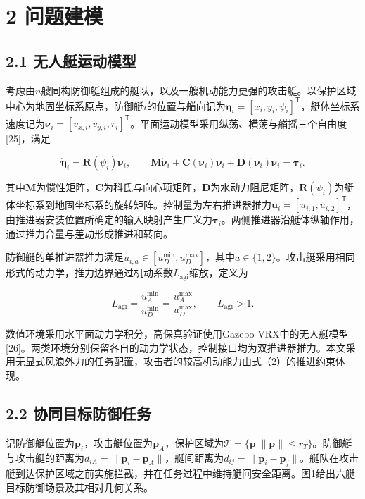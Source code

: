 \documentclass[
  11pt,
  fontset=none]{ctexart}
\begin{document}
\section{2 问题建模}\label{ux95eeux9898ux5efaux6a21}

\subsection{2.1
无人艇运动模型}\label{ux65e0ux4ebaux8247ux8fd0ux52a8ux6a21ux578b}

考虑由\(n\)艘同构防御艇组成的艇队，以及一艘机动能力更强的攻击艇。以保护区域中心为地固坐标系原点，防御艇\(i\)的位置与艏向记为\(\boldsymbol\eta_i=[x_i,y_i,\psi_i]^\mathsf T\)，艇体坐标系速度记为\(\boldsymbol\nu_i=[v_{x,i},v_{y,i},r_i]^\mathsf T\)。平面运动模型采用纵荡、横荡与艏摇三个自由度{[}25{]}，满足

\[
\dot{\boldsymbol\eta}_i=\boldsymbol R(\psi_i)\boldsymbol\nu_i,
\qquad
\boldsymbol M\dot{\boldsymbol\nu}_i+
\boldsymbol C(\boldsymbol\nu_i)\boldsymbol\nu_i+
\boldsymbol D(\boldsymbol\nu_i)\boldsymbol\nu_i
=\boldsymbol\tau_i .
\tag{1}
\]

其中\(\boldsymbol M\)为惯性矩阵，\(\boldsymbol C\)为科氏与向心项矩阵，\(\boldsymbol D\)为水动力阻尼矩阵，\(\boldsymbol R(\psi_i)\)为艇体坐标系到地固坐标系的旋转矩阵。控制量为左右推进器推力\(\boldsymbol u_i=[u_{i,1},u_{i,2}]^\mathsf T\)，由推进器安装位置所确定的输入映射产生广义力\(\boldsymbol\tau_i\)。两侧推进器沿艇体纵轴作用，通过推力合量与差动形成推进和转向。

防御艇的单推进器推力满足\(u_{i,a}\in[u_D^{\min},u_D^{\max}]\)，其中\(a\in\{1,2\}\)。攻击艇采用相同形式的动力学，推力边界通过机动系数\(L_{\mathrm{agi}}\)缩放，定义为

\[
L_{\mathrm{agi}}=
\frac{u_A^{\min}}{u_D^{\min}}
=
\frac{u_A^{\max}}{u_D^{\max}},
\qquad L_{\mathrm{agi}}>1 .
\tag{2}
\]

数值环境采用水平面动力学积分，高保真验证使用Gazebo
VRX中的无人艇模型{[}26{]}。两类环境分别保留各自的动力学状态，控制接口均为双推进器推力。本文采用无显式风浪外力的任务配置，攻击者的较高机动能力由式（2）的推进约束体现。

\subsection{2.2
协同目标防御任务}\label{ux534fux540cux76eeux6807ux9632ux5fa1ux4efbux52a1}

记防御艇位置为\(\boldsymbol p_i\)，攻击艇位置为\(\boldsymbol p_A\)，保护区域为\(\mathcal T=\{\boldsymbol p\mid\|\boldsymbol p\|\leq r_T\}\)。防御艇与攻击艇的距离为\(d_{iA}=\|\boldsymbol p_i-\boldsymbol p_A\|\)，艇间距离为\(d_{ij}=\|\boldsymbol p_i-\boldsymbol p_j\|\)。艇队在攻击艇到达保护区域之前实施拦截，并在任务过程中维持艇间安全距离。图1给出六艇目标防御场景及其相对几何关系。
\end{document}
